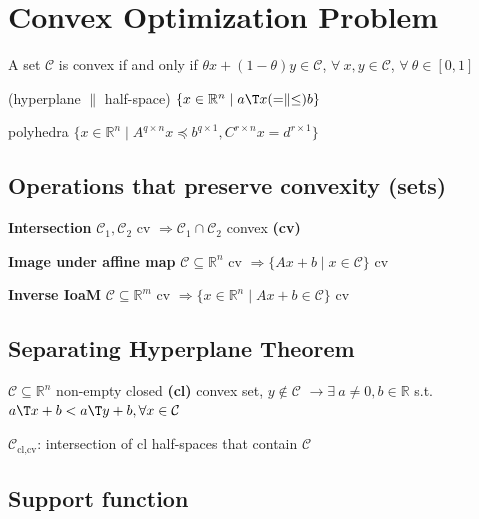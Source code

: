 \section{Convex Optimization Problem}

\begin{definition}
	A set $\mathcal{C}$ is convex if and only if
	$\theta x + (1-\theta)y \in \mathcal{C}$,
	$\forall\ x,y \in \mathcal{C}$,
	$\forall\ \theta \in [0,1]$
\end{definition}

(hyperplane $\parallel$ half-space)
$\{x \in \mathbb{R}^n \mid a\T x(=\parallel\le)b\}$

polyhedra $\{x\in\mathbb{R}^n\mid A^{q\times n}x\preceq b^{q\times1},C^{r\times n}x=d^{r\times1}\}$


\subsection{Operations that preserve convexity (sets)}

\textbf{Intersection}
$\mathcal{C}_1, \mathcal{C}_2$ cv
$\Rightarrow \mathcal{C}_1 \cap \mathcal{C}_2$ convex \textbf{(cv)}

\textbf{Image under affine map}
$\mathcal{C} \subseteq  \mathbb{R}^{n}$ cv
$\Rightarrow \{Ax+b \mid x \in \mathcal{C} \}$ cv

\textbf{Inverse IoaM}
$\mathcal{C} \subseteq  \mathbb{R}^{m}$ cv
$\Rightarrow \{x\in\mathbb{R}^{n} \mid  Ax+b\in\mathcal{C}\}$ cv

\subsection{Separating Hyperplane Theorem}

\begin{theorem}
	$\mathcal{C} \subseteq \mathbb{R}^{n}$ non-empty closed \textbf{(cl)} convex set, $y \notin \mathcal{C}$
	$\rightarrow \exists\ a \ne 0, b \in \mathbb{R}$
	s.t. $a\T x + b < a\T y + b,
		\forall x \in \mathcal{C}$
\end{theorem}

\begin{corollary}
	$\mathcal{C}_\text{cl,cv}$: intersection of cl half-spaces that contain $\mathcal{C}$
\end{corollary}

\subsection{Support function}

